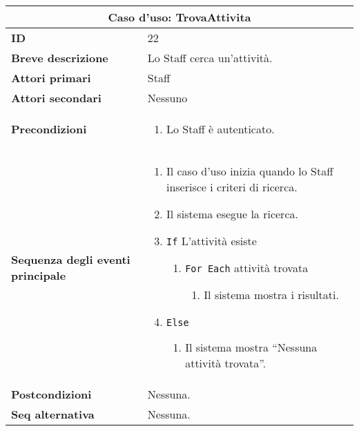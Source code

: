 \documentclass[a4paper]{report}
\begin{document}
\clearpage
\begin{table}[H]
\vspace*{-0cm}
\renewcommand{\arraystretch}{1.9}
\begin{tabular}{|p{3.9cm}|p{9.9cm}|}
\hline
\multicolumn{2}{|c|}{\textbf{Caso d’uso: TrovaAttivita}} \\ \hline
	\textbf{ID} & 22 \\ \hline
	\textbf{Breve descrizione} & Lo Staff cerca un’attività. \\ \hline
	\textbf{Attori primari} & Staff \\ \hline
	\textbf{Attori secondari} & Nessuno \\ \hline
	\textbf{Precondizioni} & \begin{enumerate}[leftmargin=14pt,label=\arabic*.,labelsep=0.5em,topsep=0pt,partopsep=0pt,parsep=0pt,itemsep=0pt]
    \item Lo Staff è autenticato.
\end{enumerate} \\ \hline
	\textbf{Sequenza degli eventi principale} & \begin{enumerate}[leftmargin=14pt,label=\arabic*.,labelsep=0.5em,topsep=0pt,partopsep=0pt,parsep=0pt,itemsep=0pt]
    \item Il caso d’uso inizia quando lo Staff inserisce i criteri di ricerca.
    \item Il sistema esegue la ricerca.
    \item \texttt{If} L’attività esiste
    \begin{enumerate}[label=\arabic{enumi}.\arabic*.,leftmargin=22pt,labelsep=0.5em,topsep=0pt,partopsep=0pt,parsep=0pt,itemsep=0pt]
        \item \texttt{For Each} attività trovata
        \begin{enumerate}[label=\arabic{enumi}.\arabic{enumii}.\arabic*.,leftmargin=22pt,labelsep=0.5em,topsep=0pt,partopsep=0pt,parsep=0pt,itemsep=0pt]
            \item Il sistema mostra i risultati.
        \end{enumerate}
    \end{enumerate}
    \item \texttt{Else}
    \begin{enumerate}[label=\arabic{enumi}.\arabic*.,leftmargin=22pt,labelsep=0.5em,topsep=0pt,partopsep=0pt,parsep=0pt,itemsep=0pt]
        \item Il sistema mostra “Nessuna attività trovata”.
    \end{enumerate}
\end{enumerate} \\ \hline
	\textbf{Postcondizioni} & Nessuna. \\ \hline
	\textbf{Seq alternativa} & Nessuna. \\ \hline
\end{tabular}
\end{table}
\end{document}

